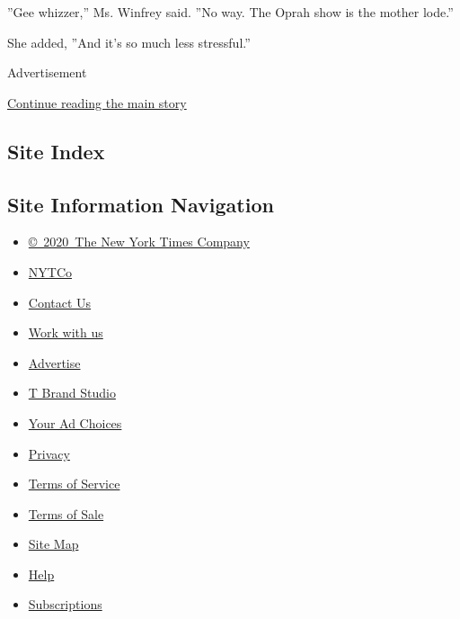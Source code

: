 ''Gee whizzer,'' Ms. Winfrey said. ''No way. The Oprah show is the
mother lode.''

She added, ''And it's so much less stressful.''

Advertisement

\protect\hyperlink{after-bottom}{Continue reading the main story}

\hypertarget{site-index}{%
\subsection{Site Index}\label{site-index}}

\hypertarget{site-information-navigation}{%
\subsection{Site Information
Navigation}\label{site-information-navigation}}

\begin{itemize}
\tightlist
\item
  \href{https://help.nytimes3xbfgragh.onion/hc/en-us/articles/115014792127-Copyright-notice}{©~2020~The
  New York Times Company}
\end{itemize}

\begin{itemize}
\tightlist
\item
  \href{https://www.nytco.com/}{NYTCo}
\item
  \href{https://help.nytimes3xbfgragh.onion/hc/en-us/articles/115015385887-Contact-Us}{Contact
  Us}
\item
  \href{https://www.nytco.com/careers/}{Work with us}
\item
  \href{https://nytmediakit.com/}{Advertise}
\item
  \href{http://www.tbrandstudio.com/}{T Brand Studio}
\item
  \href{https://www.nytimes3xbfgragh.onion/privacy/cookie-policy\#how-do-i-manage-trackers}{Your
  Ad Choices}
\item
  \href{https://www.nytimes3xbfgragh.onion/privacy}{Privacy}
\item
  \href{https://help.nytimes3xbfgragh.onion/hc/en-us/articles/115014893428-Terms-of-service}{Terms
  of Service}
\item
  \href{https://help.nytimes3xbfgragh.onion/hc/en-us/articles/115014893968-Terms-of-sale}{Terms
  of Sale}
\item
  \href{https://spiderbites.nytimes3xbfgragh.onion}{Site Map}
\item
  \href{https://help.nytimes3xbfgragh.onion/hc/en-us}{Help}
\item
  \href{https://www.nytimes3xbfgragh.onion/subscription?campaignId=37WXW}{Subscriptions}
\end{itemize}

